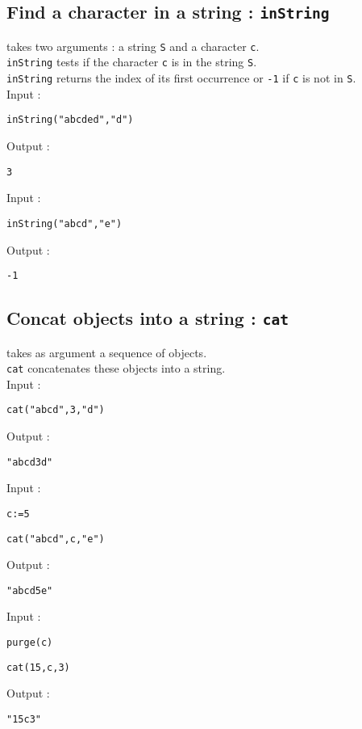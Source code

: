 \documentclass[a4paper,11pt]{book}
\begin{document}
\subsection{Find a character in a string : {\tt inString}}
 takes two arguments : a string {\tt S} and a 
character {\tt c}.\\
{\tt inString} tests if the character {\tt c} is in the string {\tt S}.\\
 {\tt inString} returns the index of its first occurrence
or {\tt -1} if {\tt c} is not in {\tt S}.\\
Input :
\begin{center}{\tt inString("abcded","d")}\end{center}
Output :
\begin{center}{\tt  3}\end{center}
Input :
\begin{center}{\tt inString("abcd","e")}\end{center}
Output :
\begin{center}{\tt  -1}\end{center}

\subsection{Concat objects into a string : {\tt cat}}
 takes as argument a sequence of objects.\\ 
{\tt cat} concatenates these objects into a string.\\
Input :
\begin{center}{\tt cat("abcd",3,"d")}\end{center}
Output :
\begin{center}{\tt  "abcd3d"}\end{center}
Input :
\begin{center}{\tt c:=5}\end{center}
\begin{center}{\tt cat("abcd",c,"e")}\end{center}
Output :
\begin{center}{\tt  "abcd5e"}\end{center}
Input :
\begin{center}{\tt purge(c)}\end{center}
\begin{center}{\tt cat(15,c,3)}\end{center}
Output :
\begin{center}{\tt  "15c3"}\end{center}
\end{document}
